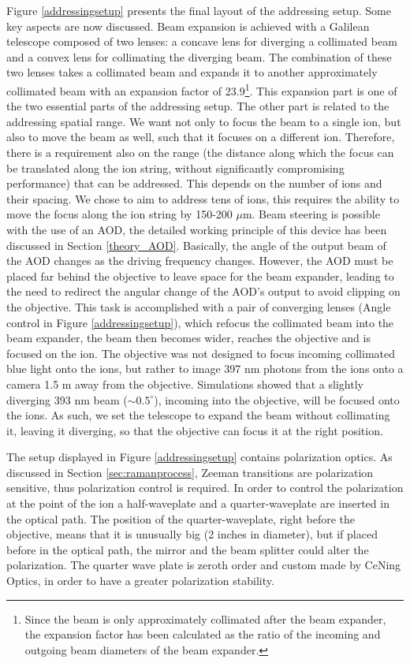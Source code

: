 Figure \ref{addressingsetup} presents the final layout of the addressing setup. Some key aspects are now discussed. Beam expansion is achieved with a Galilean telescope composed of two lenses: a concave lens for diverging a collimated beam and a convex lens for collimating the diverging beam. The combination of these two lenses takes a collimated beam and expands it to another approximately collimated beam with an expansion factor of 23.9\footnote{Since the beam is only approximately collimated after the beam expander, the expansion factor has been calculated as the ratio of the incoming and outgoing beam diameters of the beam expander.}. This expansion part is one of the two essential parts of the addressing setup. The other part is related to the addressing spatial range. We want not only to focus the beam to a single ion, but also to move the beam as well, such that it focuses on a different ion. Therefore, there is a requirement also on the range (the distance along which the focus can be translated along the ion string, without significantly compromising performance) that can be addressed. This depends on the number of ions and their spacing. We chose to aim to address tens of ions, this requires the ability to move the focus along the ion string by 150-200 $\mu$m. Beam steering is possible with the use of an AOD, the detailed working principle of this device has been discussed in Section \ref{theory_AOD}. Basically, the angle of the output beam of the AOD changes as the driving frequency changes. However, the AOD must be placed far behind the objective to leave space for the beam expander, leading to the need to redirect the angular change of the AOD's output to avoid clipping on the objective. This task is accomplished with a pair of converging lenses (Angle control in Figure \ref{addressingsetup}), which refocus the collimated beam into the beam expander, the beam then becomes wider, reaches the objective and is focused on the ion. The objective was not designed to focus incoming collimated blue light onto the ions, but rather to image 397 nm photons from the ions onto a camera 1.5 m away from the objective. Simulations showed that a slightly diverging 393 nm beam ($\sim 0.5^\circ$), incoming into the objective, will be focused onto the ions. As such, we set the telescope to expand the beam without collimating it, leaving it diverging, so that the objective can focus it at the right position.\par
The setup displayed in Figure \ref{addressingsetup} contains polarization optics. As discussed in Section \ref{sec:ramanprocess}, Zeeman transitions are polarization sensitive, thus polarization control is required. In order to control the polarization at the point of the ion a half-waveplate and a quarter-waveplate are inserted in the optical path. The position of the quarter-waveplate, right before the objective, means that it is unusually big (2 inches in diameter), but if placed before in the optical path, the mirror and the beam splitter could alter the polarization. The quarter wave plate is zeroth order and custom made by CeNing Optics, in order to have a greater polarization stability.\par
